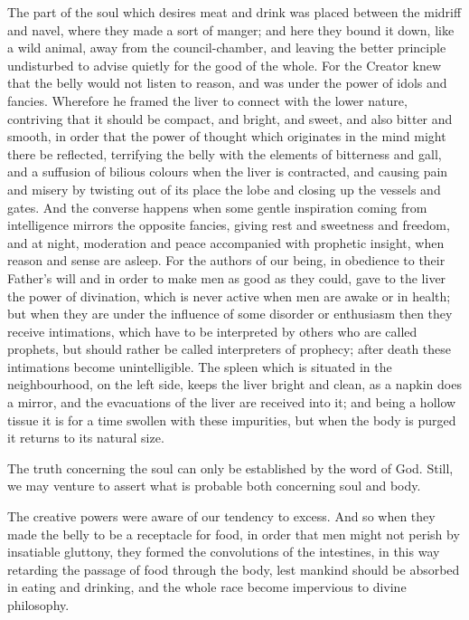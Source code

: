 The part of the soul which desires meat and drink was placed between the
midriff and navel, where they made a sort of manger; and here they bound
it down, like a wild animal, away from the council-chamber, and leaving
the better principle undisturbed to advise quietly for the good of the
whole. For the Creator knew that the belly would not listen to reason, and
was under the power of idols and fancies. Wherefore he framed the liver to
connect with the lower nature, contriving that it should be compact, and
bright, and sweet, and also bitter and smooth, in order that the power of
thought which originates in the mind might there be reflected, terrifying
the belly with the elements of bitterness and gall, and a suffusion of
bilious colours when the liver is contracted, and causing pain and misery
by twisting out of its place the lobe and closing up the vessels and
gates. And the converse happens when some gentle inspiration coming from
intelligence mirrors the opposite fancies, giving rest and sweetness and
freedom, and at night, moderation and peace accompanied with prophetic
insight, when reason and sense are asleep. For the authors of our being,
in obedience to their Father’s will and in order to make men as good as
they could, gave to the liver the power of divination, which is never
active when men are awake or in health; but when they are under the
influence of some disorder or enthusiasm then they receive intimations,
which have to be interpreted by others who are called prophets, but should
rather be called interpreters of prophecy; after death these intimations
become unintelligible. The spleen which is situated in the neighbourhood,
on the left side, keeps the liver bright and clean, as a napkin does a
mirror, and the evacuations of the liver are received into it; and being a
hollow tissue it is for a time swollen with these impurities, but when the
body is purged it returns to its natural size.

The truth concerning the soul can only be established by the word of God.
Still, we may venture to assert what is probable both concerning soul and
body.

The creative powers were aware of our tendency to excess. And so when they
made the belly to be a receptacle for food, in order that men might not
perish by insatiable gluttony, they formed the convolutions of the
intestines, in this way retarding the passage of food through the body,
lest mankind should be absorbed in eating and drinking, and the whole race
become impervious to divine philosophy.

